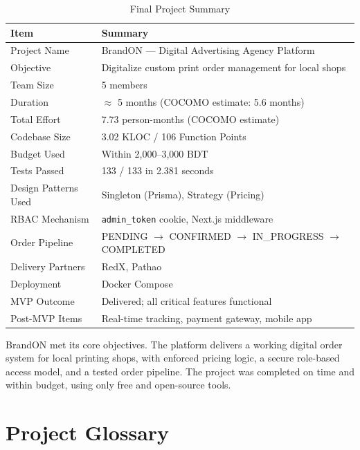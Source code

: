 \documentclass[12pt,a4paper]{report}
\begin{document}
\begin{table}[H]
  \centering
  \caption{Final Project Summary}
  \begin{tabularx}{\textwidth}{L{4cm} X}
    \toprule
    \textbf{Item} & \textbf{Summary} \\
    \midrule
    Project Name          & BrandON --- Digital Advertising Agency Platform \\
    Objective             & Digitalize custom print order management for local shops \\
    Team Size             & 5 members \\
    Duration              & $\approx$ 5 months (COCOMO estimate: 5.6 months) \\
    Total Effort          & 7.73 person-months (COCOMO estimate) \\
    Codebase Size         & 3.02 KLOC / 106 Function Points \\
    Budget Used           & Within 2,000--3,000 BDT \\
    Tests Passed          & 133 / 133 in 2.381 seconds \\
    Design Patterns Used  & Singleton (Prisma), Strategy (Pricing) \\
    RBAC Mechanism        & \texttt{admin\_token} cookie, Next.js middleware \\
    Order Pipeline        & PENDING $\to$ CONFIRMED $\to$ IN\_PROGRESS $\to$ COMPLETED \\
    Delivery Partners     & RedX, Pathao \\
    Deployment            & Docker Compose \\
    MVP Outcome           & Delivered; all critical features functional \\
    Post-MVP Items        & Real-time tracking, payment gateway, mobile app \\
    \bottomrule
  \end{tabularx}
\end{table}

BrandON met its core objectives. The platform delivers a working digital order system for local printing shops, with enforced pricing logic, a secure role-based access model, and a tested order pipeline. The project was completed on time and within budget, using only free and open-source tools.

\appendix
\chapter{Project Glossary}
\end{document}
